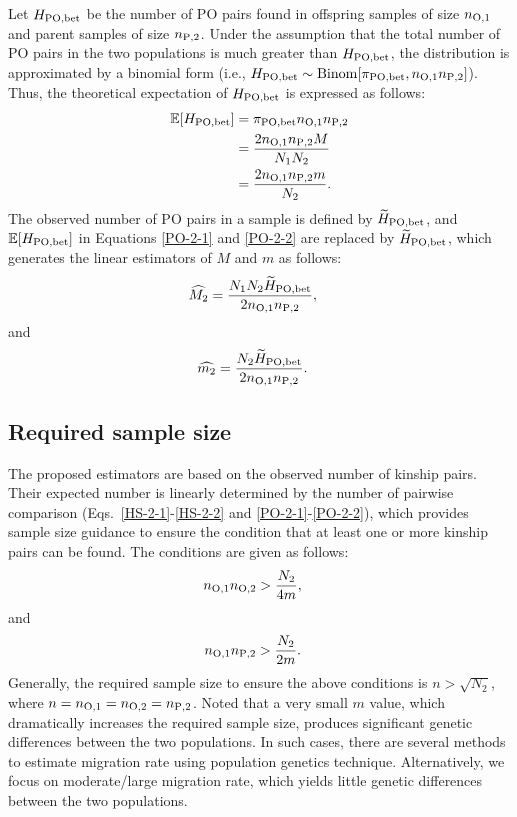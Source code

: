 \documentclass[12pt, English]{article}
\begin{document}
\begin{spacing}{1.9}
Let $H_{\rm PO,bet}$ be the number of PO pairs found in offspring samples of size $n_{\rm O, 1}$ and parent samples of size $n_{\rm P, 2}$. Under the assumption that the total number of PO pairs in the two populations is much greater than $H_{\rm PO,bet}$, the distribution is approximated by a binomial form (i.e., $H_{\rm PO,bet} \sim {\rm Binom}[\pi_{\rm PO,bet}, n_{\rm O, 1} n_{\rm P, 2}]$). Thus, the theoretical expectation of $H_{\rm PO,bet}$ is expressed as follows: 
\begin{align}
\mathbb{E}[H_{\rm PO, bet}] &= \pi_{\rm PO,bet} n_{\rm O, 1} n_{\rm P, 2} \nonumber\\
&= \frac{ 2 n_{\rm O, 1} n_{\rm P, 2} M } { N_{1} N_{2} } \label{PO-2-1} \\
&= \frac{ 2 n_{\rm O, 1} n_{\rm P, 2} m } { N_{2} }.
\label{PO-2-2}
\end{align}
The observed number of PO pairs in a sample is defined by $\widetilde{H}_{\rm PO, bet}$, and $\mathbb{E}[H_{\rm PO, bet}]$ in Equations \ref{PO-2-1} and \ref{PO-2-2} are replaced by $\widetilde{H}_{\rm PO, bet}$, which generates the linear estimators of $M$ and $m$ as follows:
\begin{align}
\widehat{M_2} &= \frac{N_{1} N_{2} \widetilde{H}_{\rm PO,bet} } {2 n_{\rm O, 1} n_{\rm P, 2} },
\label{PO-3}
\end{align}
and
\begin{align}
\widehat{m_2} &= \frac{N_{2} \widetilde{H}_{\rm PO,bet} } {2 n_{\rm O, 1} n_{\rm P, 2} }.
\label{PO-4}
\end{align}

\subsection{Required sample size}

The proposed estimators are based on the observed number of kinship pairs. Their expected number is linearly determined by the number of pairwise comparison (Eqs.~\ref{HS-2-1}-\ref{HS-2-2} and \ref{PO-2-1}-\ref{PO-2-2}), which provides sample size guidance to ensure the condition that at least one or more kinship pairs can be found. The conditions are given as follows: 
\begin{align}
n_{\rm O, 1} n_{\rm O, 2} &> \frac{ N_{2} } { 4m },
\label{RS-1}
\end{align}
and
\begin{align}
n_{\rm O, 1} n_{\rm P, 2} &> \frac{ N_{2} } { 2m }.
\label{RS-2}
\end{align}
Generally, the required sample size to ensure the above conditions is $n>\sqrt{N_2}$, where $n = n_{\rm O, 1}=n_{\rm O, 2}=n_{\rm P, 2}$. Noted that a very small $m$ value, which dramatically increases the required sample size, produces significant genetic differences between the two populations. In such cases, there are several methods to estimate migration rate using population genetics technique. Alternatively, we focus on moderate/large migration rate, which yields little genetic differences between the two populations. 


\end{spacing}
\end{document}
